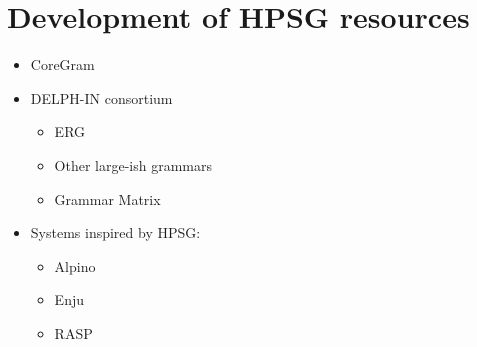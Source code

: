 \documentclass[output=paper]{langsci/langscibook}
\begin{document}
\section{Development of HPSG resources}
\label{sec:resources}


\begin{itemize}
 \item  CoreGram
 \item  DELPH-IN consortium
    \begin{itemize}
    \item ERG
    \item Other large-ish grammars
    \item Grammar Matrix
    \end{itemize}
 \item Systems inspired by HPSG:
   \begin{itemize}
     \item Alpino
     \item Enju
     \item RASP
   \end{itemize}
\end{itemize}






\end{document}
